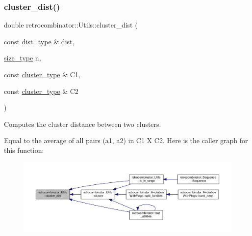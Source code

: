 \subsubsection{\texorpdfstring{cluster\+\_\+dist()}{cluster\_dist()}}
{\footnotesize\ttfamily double retrocombinator\+::\+Utils\+::cluster\+\_\+dist (\begin{DoxyParamCaption}\item[{const \hyperlink{constants_8h_aa416b6a3a9e444eae3309a16b8607750}{dist\+\_\+type} \&}]{dist,  }\item[{\hyperlink{constants_8h_a8e1541b50cee66a791df4c437ccbb385}{size\+\_\+type}}]{n,  }\item[{const \hyperlink{constants_8h_a316667a6633d664fe892bd7e0eb0141e}{cluster\+\_\+type} \&}]{C1,  }\item[{const \hyperlink{constants_8h_a316667a6633d664fe892bd7e0eb0141e}{cluster\+\_\+type} \&}]{C2 }\end{DoxyParamCaption})}



Computes the cluster distance between two clusters. 

Equal to the average of all pairs (a1, a2) in C1 X C2. Here is the caller graph for this function\+:
\nopagebreak
\begin{figure}[H]
\begin{center}
\leavevmode
\includegraphics[width=350pt]{namespaceretrocombinator_1_1Utils_a75c34419887242476ac8219dfb981459_icgraph}
\end{center}
\end{figure}
\mbox{\label{namespaceretrocombinator_1_1Utils_a984680ddd6d1f7ccee9e0f040ff16183}} 
